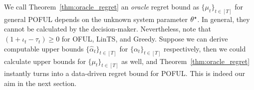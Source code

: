 \begin{remark}
	We call Theorem~\ref{thm:oracle_regret} an  \emph{oracle} regret bound as  $\{\mu_t\}_{t\in[T]}$ for general POFUL depends on the unknown system parameter $\theta^\star$. In general, they cannot be calculated by the decision-maker. Nevertheless, note that $(1+\iota_t -\tau_t) \geq 0$ for OFUL, LinTS, and Greedy. Suppose we can derive computable upper bounds $\{\hat{\alpha}_t\}_{t\in[T]}$ for $\{\alpha_t\}_{t\in[T]}$ respectively, then we could calculate upper bounds for $\{\mu_t\}_{t\in[T]}$ as well, and Theorem~\ref{thm:oracle_regret} instantly turns into a data-driven regret bound for POFUL. This is indeed our aim in the next section. 
\end{remark}



 



